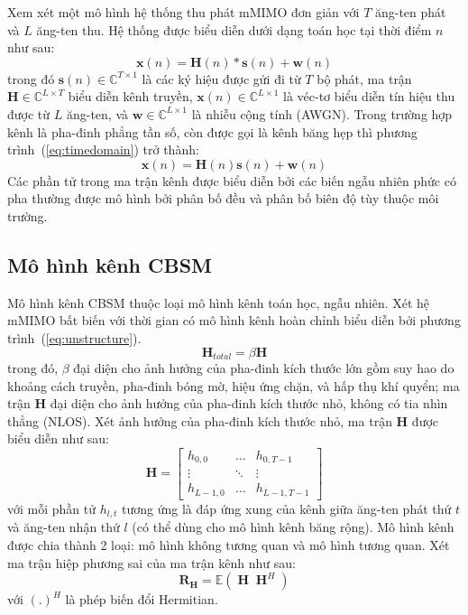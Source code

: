 Xem xét một mô hình hệ thống thu phát mMIMO đơn giản với $T$ ăng-ten phát và $L$ ăng-ten thu. Hệ thống được biểu diễn dưới dạng toán học tại thời điểm $n$ như sau: 
\begin{equation}
\label{eq:timedomain}
    \mathbf{x}(n) = \mathbf{H}(n)*\mathbf{s}(n) + \mathbf{w}(n)
\end{equation}
trong đó $\mathbf{s}(n) \in \mathbb{C}^{T \times 1}$ là các ký hiệu được gửi đi từ $T$ bộ phát, ma trận $\mathbf{H} \in \mathbb{C}^{L\times T}$ biểu diễn kênh truyền, $\mathbf{x}(n) \in \mathbb{C}^{L \times 1}$ là véc-tơ biểu diễn tín hiệu thu được từ $L$ ăng-ten, và $\mathbf{w} \in \mathbb{C}^{L \times 1}$ là nhiễu cộng tính (AWGN).
Trong trường hợp kênh là pha-đinh phẳng tần số, còn được gọi là kênh băng hẹp thì phương trình~(\ref{eq:timedomain}) trở thành:  
\begin{equation}
    \mathbf{x}(n) = \mathbf{H}(n)\mathbf{s}(n) + \mathbf{w}(n)
\end{equation}
Các phần tử trong ma trận kênh được biểu diễn bởi các biến ngẫu nhiên phức có pha thường được mô hình bởi phân bố đều và phân bố biên độ tùy thuộc môi trường.


\subsection{Mô hình kênh CBSM}
Mô hình kênh CBSM thuộc loại mô hình kênh toán học, ngẫu nhiên.
Xét hệ mMIMO bất biến với thời gian có mô hình kênh hoàn chỉnh biểu diễn bởi phương trình~(\ref{eq:unstructure}).
\begin{equation}
    \label{eq:unstructure}
    \mathbf{H}_{total} = \beta \mathbf{H} 
\end{equation}
trong đó, $\beta$ đại diện cho ảnh hưởng của pha-đinh kích thước lớn gồm suy hao do khoảng cách truyền, pha-đinh bóng mờ, hiệu ứng chặn, và hấp thụ khí quyển; ma trận $\mathbf{H}$ đại diện cho ảnh hưởng của pha-đinh kích thước nhỏ, không có tia nhìn thẳng (NLOS). Xét ảnh hưởng của pha-đinh kích thước nhỏ, ma trận $\mathbf{H}$ được biểu diễn như sau:
\begin{equation}
    \mathbf{H} = \begin{bmatrix}
    h_{0,0} & \ldots  & h_{0, T-1} \\ 
    \vdots & \ddots & \vdots\\ 
    h_{L-1, 0} & \ldots  & h_{L-1, T-1}
    \end{bmatrix}
\end{equation}
với mỗi phần tử $h_{l,t}$ tương ứng là đáp ứng xung của kênh giữa ăng-ten phát thứ $t$ và ăng-ten nhận thứ $l$ (có thể dùng cho mô hình kênh băng rộng). 
Mô hình kênh được chia thành 2 loại: mô hình không tương quan và mô hình tương quan. Xét ma trận hiệp phương sai của ma trận kênh như sau:
\begin{equation}
    \label{eq:1.6}
    \mathbf{R}_{\mathbf{H}} = \mathbb{E} ({\operatorname{\mathbf{H}} \operatorname{\mathbf{H}}^H})
\end{equation}
với $(.)^H$ là phép biến đổi Hermitian.

